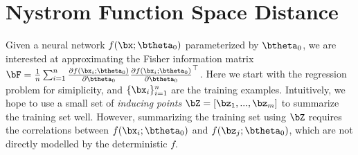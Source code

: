 \section{Nystrom Function Space Distance}

Given a neural network $f(\bx; \btheta_0)$ parameterized by $\btheta_0$, we are interested at approximating the Fisher information matrix $\bF = \frac{1}{n}\sum_{i=1}^n \frac{\partial f(\bx_i; \btheta_0)}{\partial \btheta_0} \frac{\partial f(\bx_i; \btheta_0)}{\partial \btheta_0}^{\top}$. Here we start with the regression problem for simiplicity, and $\{\bx_i\}_{i=1}^n$ are the training examples. Intuitively, we hope to use a small set of \textit{inducing points} $\bZ=[\bz_1, ..., \bz_m]$ to summarize the training set well. However, summarizing the training set using $\bZ$ requires the correlations between $f(\bx_i; \btheta_0)$ and $f(\bz_j; \btheta_0)$, which are not directly modelled by the deterministic $f$.

